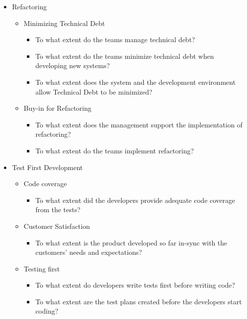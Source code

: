 \begin{itemize}
	\item Refactoring 
		\begin{itemize}
			\item Minimizing Technical Debt 
				\begin{itemize}
					\item To what extent do the teams manage technical debt? 
					\item To what extent do the teams minimize technical debt when developing new systems? 
					\item To what extent does the system and the development environment allow Technical Debt to be minimized? 
				\end{itemize}
			\item Buy-in for Refactoring 
				\begin{itemize}
					\item To what extent does the management support the implementation of refactoring? 
					\item To what extent do the teams implement refactoring? 
				\end{itemize}
		\end{itemize}
		
	\item Test First Development
		\begin{itemize}
			\item Code coverage
				\begin{itemize}
					\item To what extent did the developers provide adequate code coverage from the tests?
				\end{itemize}				 
		\end{itemize}
		\begin{itemize}
			\item Customer Satisfaction
				\begin{itemize}
					\item To what extent is the product developed so far in-sync with the customers' needs and expectations?
				\end{itemize}
		\end{itemize}
		\begin{itemize}
			\item Testing first
				\begin{itemize}
					\item To what extent do developers write tests first before writing code?
					\item To what extent are the test plans created before the developers start coding?
				\end{itemize}
		\end{itemize}
		

\end{itemize}
